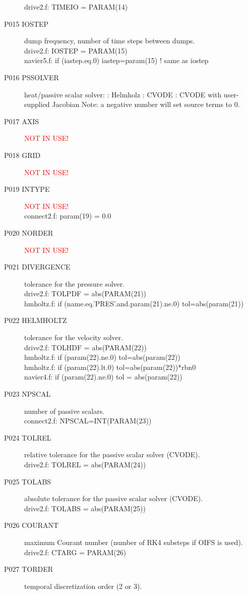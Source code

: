 \begin{description}
drive2.f:      TIMEIO = PARAM(14)
\item [P015  IOSTEP] dump frequency, number of time steps between dumps.\\
drive2.f:      IOSTEP = PARAM(15)\\
navier5.f:      if  (iastep.eq.0) iastep=param(15)   ! same as iostep
\item [P016  PSSOLVER] heat/passive scalar solver:
	: Helmholz
	: CVODE
	: CVODE with user-supplied Jacobian
	\subitem Note: a negative number will set source terms to 0.
\item [P017  AXIS]  {\textcolor{red}{ NOT IN USE!}}
\item [P018  GRID] {\textcolor{red}{ NOT IN USE!}}
\item [P019  INTYPE] {\textcolor{red}{ NOT IN USE!}}\\
 connect2.f:            param(19) = 0.0
\item [P020  NORDER]  {\textcolor{red}{ NOT IN USE!}}
\item [P021  DIVERGENCE] tolerance for the pressure solver.\\
drive2.f:      TOLPDF = abs(PARAM(21))\\
hmholtz.f:      if (name.eq.'PRES'.and.param(21).ne.0) tol=abs(param(21))
\item [P022  HELMHOLTZ] tolerance for the velocity solver.\\
drive2.f:      TOLHDF = abs(PARAM(22))\\
hmholtz.f:      if (param(22).ne.0) tol=abs(param(22))\\
hmholtz.f:         if (param(22).lt.0) tol=abs(param(22))*rbn0\\
navier4.f:      if (param(22).ne.0) tol = abs(param(22))
\item [P023  NPSCAL] number of passive scalars.\\
connect2.f:      NPSCAL=INT(PARAM(23))
\item [P024  TOLREL] relative tolerance for the passive scalar solver (CVODE).\\
drive2.f:      TOLREL = abs(PARAM(24))
\item [P025  TOLABS] absolute tolerance for the passive scalar solver (CVODE).\\
drive2.f:      TOLABS = abs(PARAM(25))
\item [P026  COURANT] maximum Courant number (number of RK4 substeps if OIFS is used).\\
drive2.f:      CTARG  = PARAM(26)
\item [P027  TORDER] temporal discretization order (2 or 3).\\

\end{description}
